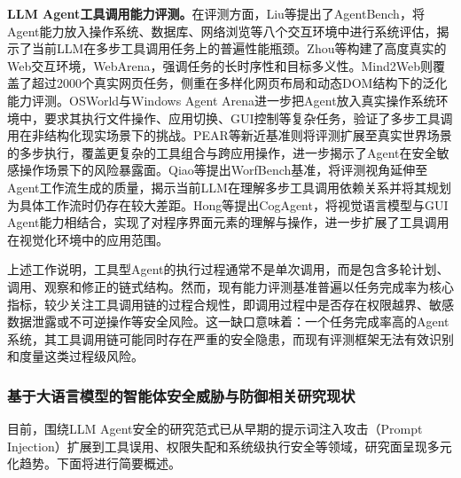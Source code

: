 \textbf{LLM Agent工具调用能力评测。}在评测方面，Liu等\cite{liu2024agentbench}提出了AgentBench，将Agent能力放入操作系统、数据库、网络浏览等八个交互环境中进行系统评估，揭示了当前LLM在多步工具调用任务上的普遍性能瓶颈。Zhou等\cite{zhou2023webarena}构建了高度真实的Web交互环境，WebArena，强调任务的长时序性和目标多义性。Mind2Web\cite{deng2023mind2web}则覆盖了超过2000个真实网页任务，侧重在多样化网页布局和动态DOM结构下的泛化能力评测。OSWorld\cite{xie2024osworld}与Windows Agent Arena\cite{bonatti2025windows}进一步把Agent放入真实操作系统环境中，要求其执行文件操作、应用切换、GUI控制等复杂任务，验证了多步工具调用在非结构化现实场景下的挑战。PEAR\cite{dong2026pear}等新近基准则将评测扩展至真实世界场景的多步执行，覆盖更复杂的工具组合与跨应用操作，进一步揭示了Agent在安全敏感操作场景下的风险暴露面。Qiao等\cite{qiao2025worfbench}提出WorfBench基准，将评测视角延伸至Agent工作流生成的质量，揭示当前LLM在理解多步工具调用依赖关系并将其规划为具体工作流时仍存在较大差距。Hong等\cite{hong2024cogagent}提出CogAgent，将视觉语言模型与GUI Agent能力相结合，实现了对程序界面元素的理解与操作，进一步扩展了工具调用在视觉化环境中的应用范围。

上述工作说明，工具型Agent的执行过程通常不是单次调用，而是包含多轮计划、调用、观察和修正的链式结构。然而，现有能力评测基准普遍以任务完成率为核心指标，较少关注工具调用链的过程合规性，即调用过程中是否存在权限越界、敏感数据泄露或不可逆操作等安全风险。这一缺口意味着：一个任务完成率高的Agent系统，其工具调用链可能同时存在严重的安全隐患，而现有评测框架无法有效识别和度量这类过程级风险。

\subsubsection{基于大语言模型的智能体安全威胁与防御相关研究现状}

目前，围绕LLM Agent安全的研究范式已从早期的提示词注入攻击（Prompt Injection）扩展到工具误用、权限失配和系统级执行安全等领域，研究面呈现多元化趋势。下面将进行简要概述。


